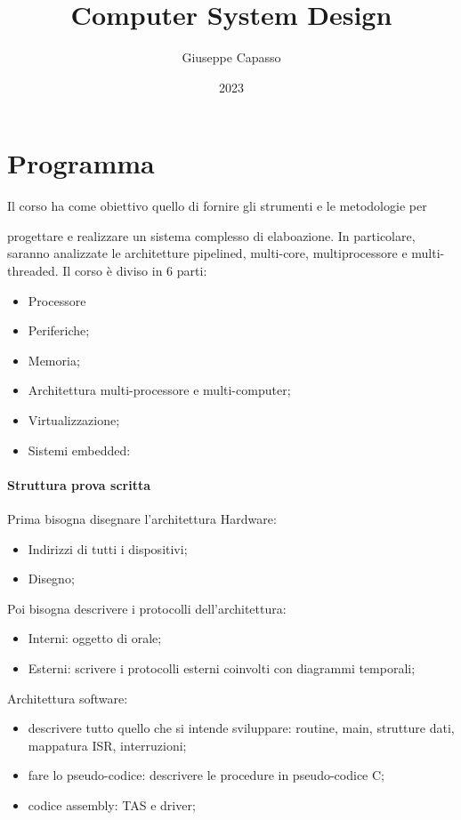 \documentclass{article}
\title{Computer System Design}
\author{Giuseppe Capasso}
\date{2023}
\begin{document}
\clearpage\maketitle
\thispagestyle{empty}

\tableofcontents
\clearpage 
\thispagestyle{empty}
\section*{Programma}
Il corso ha come obiettivo quello di fornire gli strumenti e le metodologie per 

progettare e realizzare un sistema complesso di elaboazione. In particolare,
saranno analizzate le architetture pipelined, multi-core, multiprocessore e 
multi-threaded.
Il corso è diviso in 6 parti:
\begin{itemize}
  \item Processore
  \item Periferiche;
  \item Memoria;
  \item Architettura multi-processore e multi-computer;
  \item Virtualizzazione; 
  \item Sistemi embedded:
\end{itemize}
\newpage

\paragraph{Struttura prova scritta}
Prima bisogna disegnare l'architettura Hardware:
\begin{itemize}
  \item Indirizzi di tutti i dispositivi;
  \item Disegno;
\end{itemize}

Poi bisogna descrivere i protocolli dell'architettura:
\begin{itemize}
  \item Interni: oggetto di orale;
  \item Esterni: scrivere i protocolli esterni coinvolti con diagrammi temporali;
\end{itemize}

Architettura software:
\begin{itemize}
  \item descrivere tutto quello che si intende sviluppare: routine, main, strutture dati, 
  mappatura ISR, interruzioni;
  \item fare lo pseudo-codice: descrivere le procedure in pseudo-codice C;
  \item codice assembly: TAS e driver;
\end{itemize}
\clearpage
\end{document}
